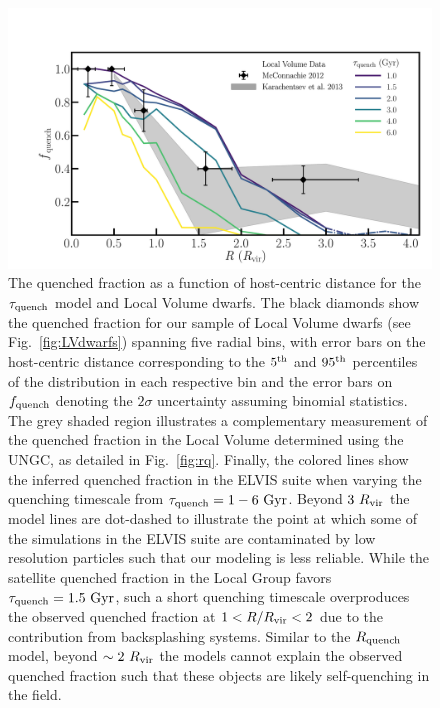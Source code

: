 \documentclass[usenatbib]{mnras}
\newcommand{\rvir}{R_{\rm vir}}
\newcommand{\lt}{<}
\begin{document}
\begin{figure}
 \centering
 \hspace*{-0.1in}
 \includegraphics[width=6in]{fig3.pdf}
 \caption{The quenched fraction as a function of host-centric distance for the
   $\tau_{\rm quench}$ model and Local Volume dwarfs.  The black diamonds show
   the quenched fraction for our sample of Local Volume dwarfs (see
   Fig.~\ref{fig:LVdwarfs}) spanning five radial bins, with error bars on the
   host-centric distance corresponding to the $5^{\rm th}$ and $95^{\rm th}$
   percentiles of the distribution in each respective bin and the error bars on
   $f_{\rm quench}$ denoting the $2\sigma$ uncertainty assuming binomial
   statistics. The grey shaded region illustrates a complementary measurement of
   the quenched fraction in the Local Volume determined using the UNGC, as
   detailed in Fig.~\ref{fig:rq}. Finally, the colored lines show the inferred
   quenched fraction in the ELVIS suite when varying the quenching timescale
   from $\tau_{\rm quench} = 1-6~{\rm Gyr}$.
   Beyond $3~\rvir$ the model lines are dot-dashed to illustrate the
   point at which some of the simulations in the ELVIS suite are
   contaminated by low resolution particles such that our modeling is
   less reliable. 
   While the satellite quenched fraction in the Local Group favors
   $\tau_{\rm quench}=1.5~{\rm Gyr}$, such a short quenching timescale
   overproduces the observed quenched fraction at $1 \lt R/\rvir \lt
   2$ due to the contribution from backsplashing systems.
   Similar to the $R_{\rm quench}$ model, beyond $\sim2~\rvir$ the
   models cannot explain the observed quenched fraction such that
   these objects are likely self-quenching in the field.}
 \label{fig:tq}
\end{figure}
\end{document}
